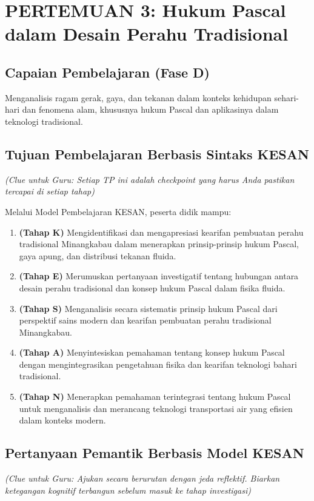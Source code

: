 \documentclass[12pt,a4paper]{article}
\begin{document}
\section{PERTEMUAN 3: Hukum Pascal dalam Desain Perahu Tradisional}

\subsection{Capaian Pembelajaran (Fase D)}
Menganalisis ragam gerak, gaya, dan tekanan dalam konteks kehidupan sehari-hari dan fenomena alam, khususnya hukum Pascal dan aplikasinya dalam teknologi tradisional.

\subsection{Tujuan Pembelajaran Berbasis Sintaks KESAN}
\textit{(Clue untuk Guru: Setiap TP ini adalah checkpoint yang harus Anda pastikan tercapai di setiap tahap)}

Melalui Model Pembelajaran KESAN, peserta didik mampu:

\begin{enumerate}
\item \textbf{(Tahap K)} Mengidentifikasi dan mengapresiasi kearifan pembuatan perahu tradisional Minangkabau dalam menerapkan prinsip-prinsip hukum Pascal, gaya apung, dan distribusi tekanan fluida.
\item \textbf{(Tahap E)} Merumuskan pertanyaan investigatif tentang hubungan antara desain perahu tradisional dan konsep hukum Pascal dalam fisika fluida.
\item \textbf{(Tahap S)} Menganalisis secara sistematis prinsip hukum Pascal dari perspektif sains modern dan kearifan pembuatan perahu tradisional Minangkabau.
\item \textbf{(Tahap A)} Menyintesiskan pemahaman tentang konsep hukum Pascal dengan mengintegrasikan pengetahuan fisika dan kearifan teknologi bahari tradisional.
\item \textbf{(Tahap N)} Menerapkan pemahaman terintegrasi tentang hukum Pascal untuk menganalisis dan merancang teknologi transportasi air yang efisien dalam konteks modern.
\end{enumerate}

\subsection{Pertanyaan Pemantik Berbasis Model KESAN}
\textit{(Clue untuk Guru: Ajukan secara berurutan dengan jeda reflektif. Biarkan ketegangan kognitif terbangun sebelum masuk ke tahap investigasi)}
\end{document}
